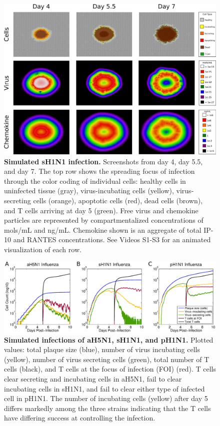 \documentclass[preprint,10pt,authoryear]{elsarticle}
\begin{document}
\begin{figure}[!ht]
\begin{center}
\includegraphics[width=\textwidth]{Figure_5}
 \end{center}
\caption{{\bf Simulated sH1N1 infection.} Screenshots from day 4, day 5.5, and day 7.  The top row shows the spreading focus of infection  through the color coding of individual cells:  healthy cells in uninfected tissue (gray),  virus-incubating cells (yellow), virus-secreting cells (orange), apoptotic cells (red), dead cells (brown), and T cells arriving at day 5 (green).  Free virus and chemokine particles are represented by compartmentalized concentrations of mols/mL and ng/mL.  Chemokine shown is an aggregate of total IP-10 and RANTES concentrations.  See Videos S1-S3 for an animated visualization of each row.} 
 \label{fig:cycells}
\end{figure}


\begin{figure}[!ht]
\begin{center}
\includegraphics[width=\textwidth]{Figure_6}
 \end{center}
\caption{{\bf Simulated infections of aH5N1, sH1N1, and pH1N1.} Plotted values: total plaque size (blue), number of virus incubating cells (yellow), number of virus secreting cells (green), total number of T cells (black), and T cells at the focus of infection (FOI) (red).  T cells clear secreting and incubating cells in aH5N1, fail to clear incubating cells in sH1N1, and fail to clear either type of infected cell in pH1N1.  The number of incubating cells (yellow) after day 5 differs markedly among the three strains indicating that the T cells have differing success at controlling the infection.} 
 \label{fig:plaquesize}
\end{figure}
\end{document}
